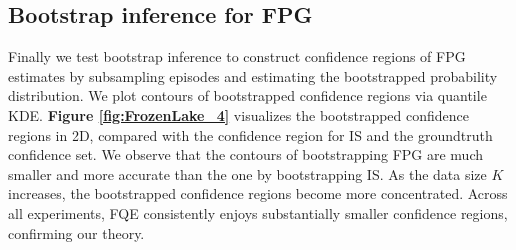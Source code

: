 \documentclass{article}
\numberwithin{equation}{section}
\begin{document}
\subsection{Bootstrap inference for FPG}
Finally we test bootstrap inference to construct confidence regions of FPG estimates by subsampling episodes and estimating the bootstrapped probability distribution. 
We plot contours of bootstrapped confidence regions via quantile KDE. 
\textbf{Figure \ref{fig:FrozenLake_4}} visualizes the bootstrapped confidence regions in 2D, compared with the confidence region for IS and the groundtruth confidence set. We observe that the contours of bootstrapping FPG are much smaller and more accurate than the one by bootstrapping IS. As the data size $K$ increases, the bootstrapped confidence regions become more concentrated. Across all experiments, FQE consistently enjoys substantially smaller confidence regions, confirming our theory.


\begin{comment}
\begin{algorithm}[t]
\caption{Bootstrapping FPG}
\label{alg:BFPG}
\begin{algorithmic}[1]%
    \Require Dataset $\mathcal{D}$, target policy $\pi$, number of bootstrap samples $B$.
    \State Compute FPG estimator $\widehat{\nabla_\theta v_\theta}(\mathcal{D})$ (Algorithm \ref{alg1}).
    \For{$b=1,\ldots, B$}
    \State Sample $\mathcal{D}$ with replacement by episode $K$ times for $\mathcal{D}_{K}^{(b)*}$.
    \State Compute  $\widehat{\nabla_\theta v_\theta}(\mathcal{D}_{K}^{(b)*})$.
    \State Compute $\varepsilon^{(b)} = \widehat{\nabla_\theta v_\theta}(\mathcal{D}_{K}^{(b)*})-\widehat{\nabla_\theta v_\theta}(\mathcal{D})$.
    \EndFor  
    \State Return $\mathcal{E} := \{\varepsilon^{(1)},\ldots, \varepsilon^{(B)}\}$.
\end{algorithmic}
\end{algorithm}
\end{comment}
\end{document}
